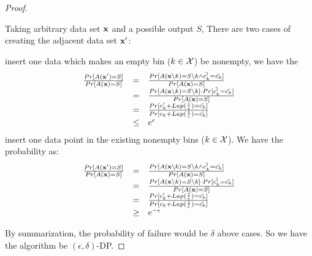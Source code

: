 \documentclass[11pt]{article}
\begin{document}
\begin{proof}
\begin{itemize}
Taking arbitrary data set $\mathbf{x}$ and a possible output $S$, There are two cases of creating the adjacent data set $\mathbf{x}'$:
%
\begin{itemize} 
 insert one data which makes an empty bin ($k \in \mathcal{X}$) be nonempty, we have the 
\[
	\begin{array}{rcl}
	\frac{Pr[A(\mathbf{x}') = S]}
	{Pr[A(\mathbf{x}) = S]}
	& = & 
	\frac{Pr[A(\mathbf{x} \setminus k) = S\setminus k 
	\land \tilde{c'_k} = \tilde{c_k}]}
	{Pr[A(\mathbf{x}) = S]}\\
	& = &
	\frac{Pr[A(\mathbf{x} \setminus k) = S\setminus k ] \cdot Pr[\tilde{c'_k} = \tilde{c_k}]}
	{Pr[A(\mathbf{x}) = S]}\\
	& = &
	\frac{Pr[ c'_k + Lap(\frac{1}{\epsilon}) = \tilde{c_k}]}
	{Pr[c_k + Lap(\frac{1}{\epsilon}) = \tilde{c_k}]}\\
	& \leq &
	e^{\epsilon}
	\end{array}
\]
%
 insert one data point in the existing nonempty bins ($k \in \mathcal{X}$).
We have the probability as:
\[
	\begin{array}{rcl}
	\frac{Pr[A(\mathbf{x}') = S]}
	{Pr[A(\mathbf{x}) = S]}
	& = & 
	\frac{Pr[A(\mathbf{x} \setminus k) = S\setminus k 
	\land \tilde{c'_k} = \tilde{c_k}]}
	{Pr[A(\mathbf{x}) = S]}\\
	& = &
	\frac{Pr[A(\mathbf{x} \setminus k) = S\setminus k ] \cdot Pr[\tilde{c'_k} = \tilde{c_k}]}
	{Pr[A(\mathbf{x}) = S]}\\
	& = &
	\frac{Pr[ c'_k + Lap(\frac{1}{\epsilon}) = \tilde{c_k}]}
	{Pr[c_k + Lap(\frac{1}{\epsilon}) = \tilde{c_k}]}\\
	& \geq &
	e^{-\epsilon}
	\end{array}
\]

\end{itemize}

\end{itemize}
By summarization, the probability of failure would be $\delta$ above cases. So we have the algorithm be $(\epsilon, \delta)$-DP. 
\end{proof}
\end{document}

